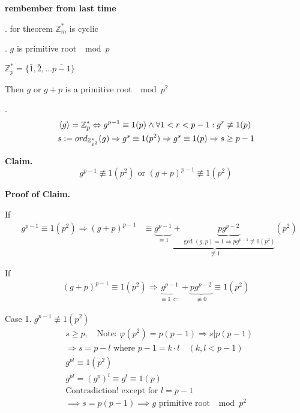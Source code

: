 

\textbf{rembember from last time}

\Proof. 
for theorem $\mathbb{Z}_m^{*}$ is cyclic

\Lemma. $g$ is primitive root $\mod p$

$\mathbb{Z}_p^{*} = \{\bar{1}, \bar{2}, \ldots \overline{p-1}\}$

Then $g$ or $g+p$ is a primitive root $\mod p^2$

\Proof. 
\begin{align*}
  &\left\langle g \right\rangle = \mathbb{Z}_p^{*} \Leftrightarrow g^{p-1} \equiv 1 (p) \land \forall 1 < r < p-1 : g^r \not\equiv 1(p) \\
  &s : = ord_{\mathbb{Z}_{p^2}^{*}} (g) \Rightarrow g^s \equiv 1 (p^2) \Rightarrow g^s \equiv 1 (p) \Rightarrow s \geq p-1
\end{align*}

\textbf{Claim.}
\[
  g^{p-1} \not\equiv 1 (p^2) \text{ or } (g+p)^{p-1} \not\equiv 1(p^2)
\]

\textbf{Proof of Claim.}

If
\begin{align*}
  &g^{p-1} \equiv 1(p^2) \Rightarrow (g+p)^{p-1} 
  &\equiv \underbrace{\underbrace{g^{p-1}}_{\equiv 1} + \underbrace{pg^{p-2}}_{\gcd(g,p) = 1 \Rightarrow pg^{p-1}\not\equiv 0 (p^2)}}_{\not\equiv 1} (p^2)
\end{align*}

If
\begin{align*}
  (g+p)^{p-1} \equiv 1(p^2) \Rightarrow \underbrace{g^{p-1}}_{\equiv 1 \Leftarrow} + \underbrace{pg^{p-2}}_{\not\equiv 0} \equiv 1 (p^2)
\end{align*}

Case 1. $g^{p-1} \not\equiv 1 (p^2)$
\begin{align*}
  &s \geq p, \quad\text{Note: } \varphi(p^2) = p(p-1) \Rightarrow s|p(p-1) \\
  &\Rightarrow s = p-l \text{ where } p-1 = k\cdot l \quad (k,l < p-1) \\
  &g^{pl} \equiv 1 (p^2) \\
  &g^{pl} = (g^p)^l \equiv g^l \equiv 1 (p) \\
  &\text{Contradiction! except for } l = p-1 \\
  &\implies s = p(p-1) \implies g \text{ primitive root } \mod p^2
\end{align*}

